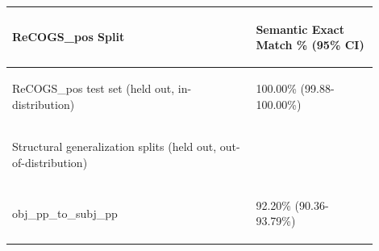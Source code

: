 \documentclass[11pt]{article}
\begin{document}
\begin{table}
\centering
\begin{tabular}{p{0.6\linewidth} p{0.3\linewidth}}
\hline
\begin{tiny}\textbf{ReCOGS\_pos Split}\end{tiny} & \begin{tiny}\textbf{Semantic Exact Match \% (95\% CI)}\end{tiny} \\
\hline
\begin{tiny}ReCOGS\_pos test set (held out, in-distribution)\end{tiny} & \begin{tiny} 100.00\% (99.88-100.00\%)\end{tiny} \\
\hline
\begin{tiny}Structural generalization splits (held out, out-of-distribution)\end{tiny} & \\
\hline
\begin{tiny}obj\_pp\_to\_subj\_pp\end{tiny} & \begin{tiny}  92.20\% (90.36- 93.79\%)\end{tiny} \\

\end{tabular}
\end{table}
\end{document}

